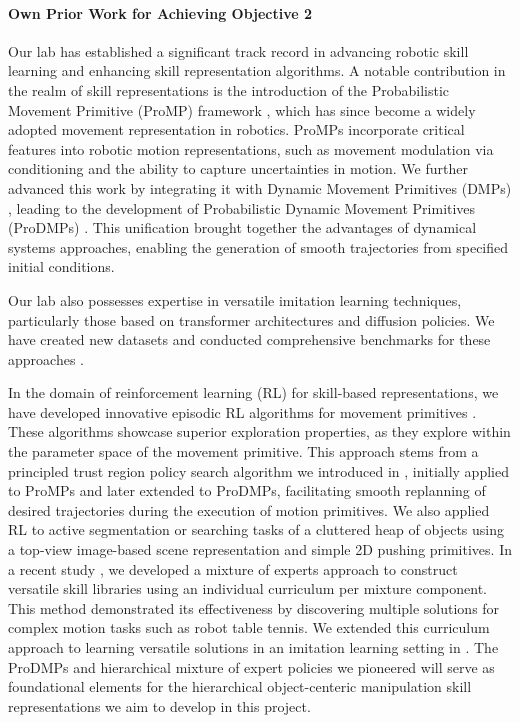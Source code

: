 \documentclass{erc-B2}
\begin{document}
\paragraph{Own Prior Work for Achieving  Objective 2}
Our lab has established a significant track record in advancing robotic skill learning and enhancing skill representation algorithms. A notable contribution in the realm of skill representations is the introduction of the Probabilistic Movement Primitive (ProMP) framework \cite{paraschos2013probabilistic}, which has since become a widely adopted movement representation in robotics. ProMPs incorporate critical features into robotic motion representations, such as movement modulation via conditioning and the ability to capture uncertainties in motion. We further advanced this work by integrating it with Dynamic Movement Primitives (DMPs) \cite{schaal2006dynamic, ijspeert2013dynamical}, leading to the development of Probabilistic Dynamic Movement Primitives (ProDMPs) \cite{li2023prodmp}. This unification brought together the advantages of dynamical systems approaches, enabling the generation of smooth trajectories from specified initial conditions.

Our lab also possesses expertise in versatile imitation learning techniques, particularly those based on transformer architectures and diffusion policies. We have created new datasets and conducted comprehensive benchmarks for these approaches \cite{David2024}.

In the domain of reinforcement learning (RL) for skill-based representations, we have developed innovative episodic RL algorithms for movement primitives \cite{otto2023deep, otto2023mp3}. These algorithms showcase superior exploration properties, as they explore within the parameter space of the movement primitive. This approach stems from a principled trust region policy search algorithm we introduced in \cite{otto2021differentiable}, initially applied to ProMPs and later extended to ProDMPs, facilitating smooth replanning of desired trajectories during the execution of motion primitives. We also applied RL to active segmentation \cite{serhan2022push} or searching \cite{Zenkri2022} tasks of a cluttered heap of objects using a top-view image-based scene representation and simple 2D pushing primitives. In a recent study \cite{celik2022specializing}, we developed a mixture of experts approach to construct versatile skill libraries using an individual curriculum per mixture component. This method demonstrated its effectiveness by discovering multiple solutions for complex motion tasks such as robot table tennis. We extended this curriculum approach to learning versatile solutions in an imitation learning setting in \cite{blessing2023information}. The ProDMPs and hierarchical mixture of expert policies we pioneered will serve as foundational elements for the hierarchical object-centeric manipulation skill representations we aim to develop in this project. 
\end{document}
